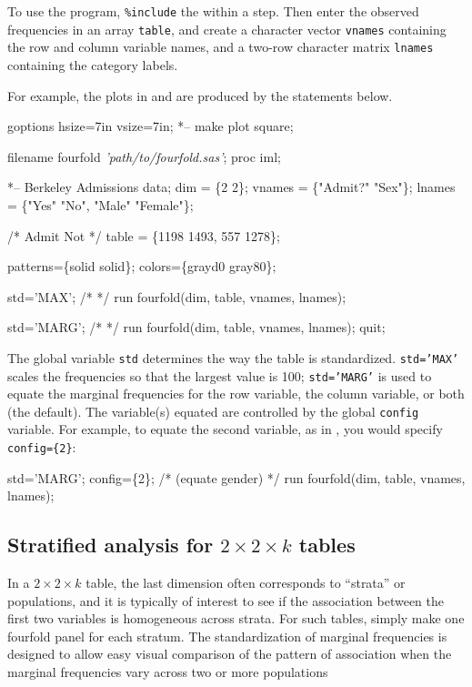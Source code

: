 To use the program, \texttt{\%include} the 
within a  step.  Then
enter the observed frequencies in an array \texttt{table},
and create a character vector \texttt{vnames} containing
the row and column variable names, and a two-row
character matrix \texttt{lnames} containing the
category labels.


For example, the plots in  and 
are produced by the statements below.
\begin{listing}
goptions hsize=7in vsize=7in;     *-- make plot square;

filename fourfold  \emph{'path/to/fourfold.sas'};
proc iml;

   *-- Berkeley Admissions data;
   dim = \{2 2\};
   vnames = \{"Admit?" "Sex"\};
   lnames = \{"Yes" "No",
             "Male"  "Female"\};

          /* Admit Not */
   table = \{1198   1493,
             557   1278\};

   patterns=\{solid solid\};
   colors=\{grayd0 gray80\};

   std='MAX';               /*  */
   run fourfold(dim, table, vnames, lnames);

   std='MARG';              /*  */
   run fourfold(dim, table, vnames, lnames);
quit;
\end{listing}
The global variable \texttt{std} determines the way the table is
standardized.
\texttt{std='MAX'} scales the frequencies so that the largest value
is 100; \texttt{std='MARG'} is used to equate the marginal frequencies
for the row variable, the column variable, or both (the default).
The variable(s) equated are controlled by the global \texttt{config}
variable.  For example, to equate the second variable, as in ,
you would specify \texttt{config=\{2\}}:
\begin{listing}
   std='MARG';
   config=\{2\};             /*  (equate gender) */
   run fourfold(dim, table, vnames, lnames);
\end{listing}

\subsection{Stratified analysis for $2 \times 2 \times k$ tables}\label{sec:twoway-fourstrat}
In a \(2 \times  2 \times  k\)
table, the last dimension often corresponds to ``strata'' or
populations, and it is typically of interest to see if the
association between the first two variables is homogeneous across
strata.  For such tables, simply make one fourfold panel for each
stratum.  The standardization of marginal frequencies is designed to
allow easy visual comparison of the pattern of association
when the marginal frequencies vary across two
or more populations

